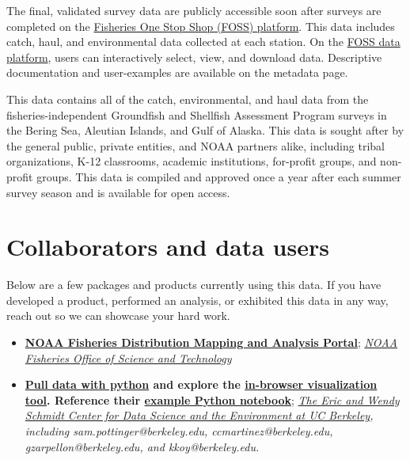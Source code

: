 \documentclass[
  letterpaper,
  oneside,
  open=any]{scrbook}
\begin{document}
The final, validated survey data are publicly accessible soon after
surveys are completed on the
\href{https://www.fisheries.noaa.gov/foss/}{Fisheries One Stop Shop
(FOSS) platform}. This data includes catch, haul, and environmental data
collected at each station. On the
\href{https://www.fisheries.noaa.gov/foss/}{FOSS data platform}, users
can interactively select, view, and download data. Descriptive
documentation and user-examples are available on the metadata page.

This data contains all of the catch, environmental, and haul data from
the fisheries-independent Groundfish and Shellfish Assessment Program
surveys in the Bering Sea, Aleutian Islands, and Gulf of Alaska. This
data is sought after by the general public, private entities, and NOAA
partners alike, including tribal organizations, K-12 classrooms,
academic institutions, for-profit groups, and non-profit groups. This
data is compiled and approved once a year after each summer survey
season and is available for open access.

\part{Collaborators and data users}

Below are a few packages and products currently using this data. If you
have developed a product, performed an analysis, or exhibited this data
in any way, reach out so we can showcase your hard work.

\begin{itemize}
\item
  \textbf{\href{https://apps-st.fisheries.noaa.gov/dismap}{NOAA
  Fisheries Distribution Mapping and Analysis Portal}};
  \emph{\href{https://www.fisheries.noaa.gov/contact/office-science-and-technology}{NOAA
  Fisheries Office of Science and Technology}}
\item
  \textbf{\href{https://pyafscgap.org/}{Pull data with python} and
  explore the
  \href{https://app.pyafscgap.org/\textquotesingle{}}{in-browser
  visualization tool}. Reference their
  \href{https://mybinder.org/v2/gh/SchmidtDSE/afscgap/main?urlpath=/tree/index.ipynb}{example
  Python notebook}}; \emph{\href{https://dse.berkeley.edu/}{The Eric and
  Wendy Schmidt Center for Data Science and the Environment at UC
  Berkeley}, including sam.pottinger@berkeley.edu,
  ccmartinez@berkeley.edu, gzarpellon@berkeley.edu, and
  kkoy@berkeley.edu.}
\end{itemize}
\end{document}

